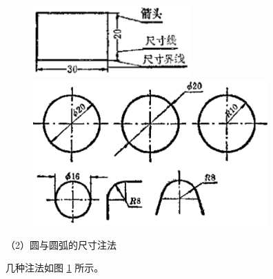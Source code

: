 \begin{figure}[htbp]
    \centering
    \begin{minipage}[b]{6cm}
        \centering
        \includegraphics[width=6cm]{../pic/czjh2-ch8-23.png}
        \caption{}\label{fig:czjh2-8-23}
    \end{minipage}
    \qquad
    \begin{minipage}[b]{9cm}
        \centering
        \includegraphics[width=9cm]{../pic/czjh2-ch8-24.png}
        \caption{}\label{fig:czjh2-8-24}
    \end{minipage}
\end{figure}

（2）圆与圆弧的尺寸注法

几种注法如图 \ref{fig:czjh2-8-24} 所示。

